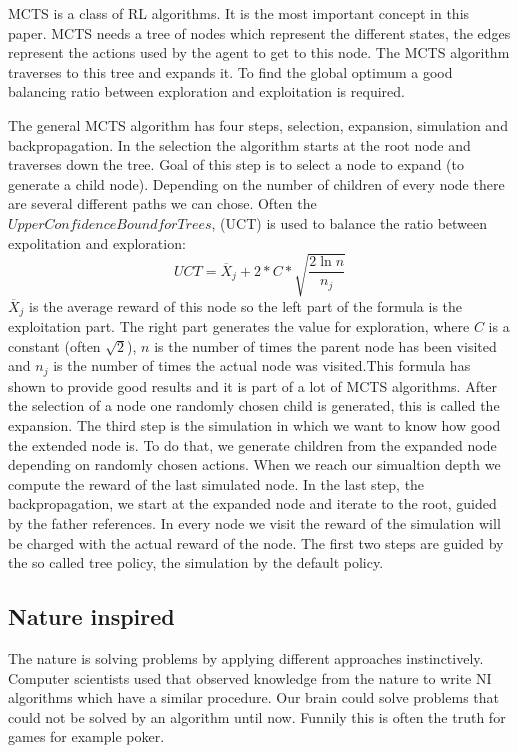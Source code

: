 \ac{MCTS} is a class of \ac{RL} algorithms. It is the most important concept in this paper. \ac{MCTS} needs a tree of nodes which represent the different states, the edges represent the actions used by the agent to get to this node. The \ac{MCTS} algorithm traverses to this tree and expands it. To find the global optimum a good balancing ratio between exploration and exploitation is required. 



The general \ac{MCTS} algorithm has four steps, selection, expansion, simulation and backpropagation.
In the selection the algorithm starts at the root node and traverses down the tree. Goal of this step is to select a node to expand (to generate a child node). Depending on the number of children of every node there are several different paths we can chose. Often the $Upper Confidence Bound for Trees$, (UCT) is used to balance the ratio between expolitation and exploration:
\begin{equation}
	UCT = \overline{X}_j + 2 * C * \sqrt{\frac{2 \ln n}{n_j}}
\end{equation}
$\overline{X}_j$ is the average reward of this node so the left part of the formula is the exploitation part. The right part generates the value for exploration, where $C$ is a constant (often $\sqrt{2}$), $n$ is the number of times the parent node has been visited and $n_j$ is the number of times the actual node was visited.This formula has shown to provide good results and it is part of a lot of \ac{MCTS} algorithms.
After the selection of a node one randomly chosen child is generated, this is called the expansion.
The third step is the simulation in which we want to know how good the extended node is. To do that, we generate children from the expanded node depending on randomly chosen actions. When we reach our simualtion depth we compute the reward of the last simulated node.
In the last step, the backpropagation, we start at the expanded node and iterate to the root, guided by the father references. In every node we visit the reward of the simulation will be charged with the actual reward of the node.
The first two steps are guided by the so called tree policy, the simulation by the default policy.

\subsection{Nature inspired} 
The nature is solving problems by applying different approaches instinctively. Computer scientists used that observed knowledge from the
nature to write \ac{NI} algorithms which have a similar procedure. Our brain could solve problems that could not be solved by an algorithm until now. Funnily this is often the truth for games for example poker.

